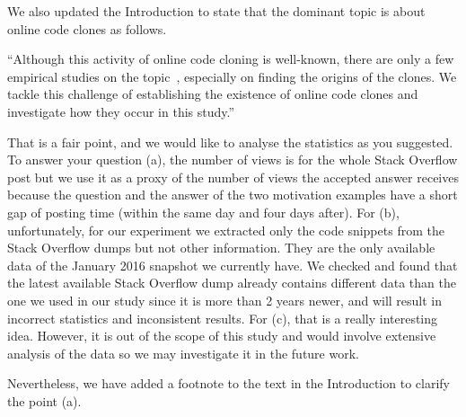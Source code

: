 \documentclass[a4paper,twoside,10pt]{reviewresponse}
\begin{document}
We also updated the Introduction to state that the dominant topic is about
online code clones as follows.

``Although this activity of online code cloning is well-known, there are only a
few empirical studies on the topic~\citep{An2017,Abdalkareem2017,Baltes2017},
especially on finding the origins of the clones. We tackle this challenge of
establishing the existence of online code clones and investigate how they occur in
this study.'' %


That is a fair point, and we would like to analyse the statistics as you
suggested. To answer your question (a), the number of views is for the whole
Stack Overflow post but we use it as a proxy of the number of views the accepted
answer receives because the question and the answer of the two motivation
examples have a short gap of posting time (within the same day and four days
after). For (b), unfortunately, for our experiment we extracted only the code
snippets from the Stack Overflow dumps but not other information. They are the
only available data of the January 2016 snapshot we currently have. We checked
and found that the latest available Stack Overflow dump already contains
different data than the one we used in our study since it is more than 2
years newer, and will result in incorrect statistics and inconsistent results.
For (c), that is a really interesting idea. However, it is out of the scope of
this study and would involve extensive analysis of the data so we may
investigate it in the future work.

Nevertheless, we have added a footnote to the text in the Introduction to
clarify the point (a).
\end{document}
